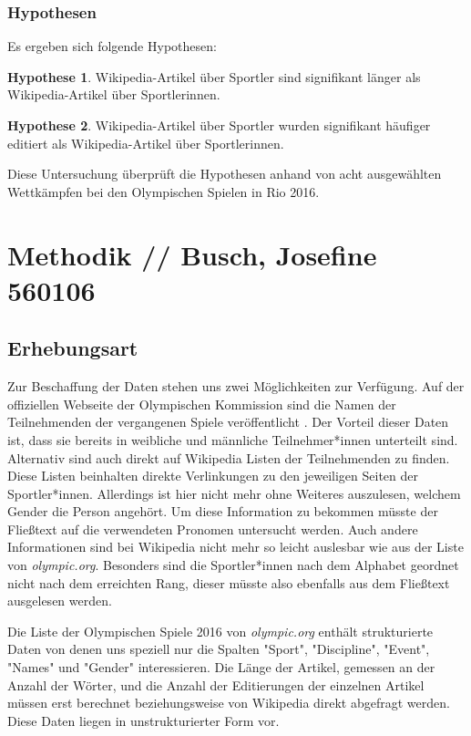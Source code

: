 \documentclass[11pt]{article}
\begin{document}
\subsubsection*{Hypothesen}

Es ergeben sich folgende Hypothesen:

\textbf{Hypothese 1}. Wikipedia-Artikel über Sportler sind signifikant länger als Wikipedia-Artikel über Sportlerinnen.

\textbf{Hypothese 2}. Wikipedia-Artikel über Sportler wurden signifikant häufiger editiert als Wikipedia-Artikel über Sportlerinnen.

Diese Untersuchung überprüft die Hypothesen anhand von acht ausgewählten Wettkämpfen bei den Olympischen Spielen in Rio 2016.

\section{Methodik // Busch, Josefine 560106}
\label{igw}

\subsection{Erhebungsart}
Zur Beschaffung der Daten stehen uns zwei Möglichkeiten zur Verfügung. Auf der offiziellen Webseite der Olympischen Kommission sind die Namen der Teilnehmenden der vergangenen Spiele veröffentlicht \parencite{olympicResults}. Der Vorteil dieser Daten ist, dass sie bereits in weibliche und männliche Teilnehmer*innen unterteilt sind. Alternativ sind auch direkt auf Wikipedia Listen der Teilnehmenden zu finden. \parencite{WikpediaOlympics2016} Diese Listen beinhalten direkte Verlinkungen zu den jeweiligen Seiten der Sportler*innen. Allerdings ist hier nicht mehr ohne Weiteres auszulesen, welchem Gender die Person angehört. Um diese Information zu bekommen müsste der Fließtext auf die verwendeten Pronomen untersucht werden. Auch andere Informationen sind bei Wikipedia nicht mehr so leicht auslesbar wie aus der Liste von \textit{olympic.org}. Besonders sind die Sportler*innen nach dem Alphabet geordnet nicht nach dem erreichten Rang, dieser müsste also ebenfalls aus dem Fließtext ausgelesen werden.

Die Liste der Olympischen Spiele 2016 von \textit{olympic.org} enthält strukturierte Daten von denen uns speziell nur die Spalten "Sport", "Discipline", "Event", "Names" und "Gender" interessieren.
Die Länge der Artikel, gemessen an der Anzahl der Wörter, und die Anzahl der Editierungen der einzelnen Artikel müssen erst berechnet beziehungsweise von Wikipedia direkt abgefragt werden. Diese Daten liegen in unstrukturierter Form vor.
\end{document}
